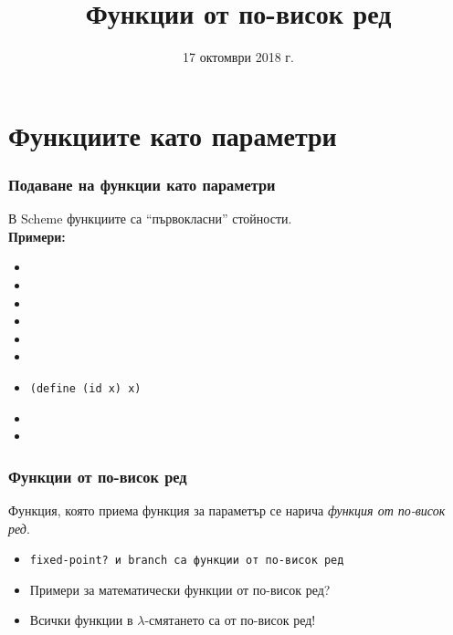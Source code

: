 \documentclass{beamer}
\title{Функции от по-висок ред}
\date{17 октомври 2018 г.}
\begin{document}
\begin{frame}
  \titlepage
\end{frame}

\section{Функциите като параметри}

\begin{frame}[fragile]
  \frametitle{Подаване на функции като параметри}

  В Scheme функциите са ``първокласни'' стойности.\\[1em]
  \pause
  \textbf{Примери:}
  \begin{itemize}[<+->]
  \item {}
  \item {}
  \item {}
  \item {}
  \item {}
    {}
  \item {}
  \item \verb#(define (id x) x)#
  \item {}
  \item {}
  \end{itemize}
\end{frame}

\begin{frame}
  \frametitle{Функции от по-висок ред}

  \begin{definition}
    Функция, която приема функция за параметър се нарича \emph{функция от по-висок ред}.
  \end{definition}
  \pause
  \begin{itemize}[<+->]
  \item \tt{fixed-point?} и \tt{branch} са функции от по-висок ред
  \item \alert{Примери за математически функции от по-висок ред?}
  \item Всички функции в $\lambda$-смятането са от по-висок ред!
  \end{itemize}
\end{frame}
\end{document}
